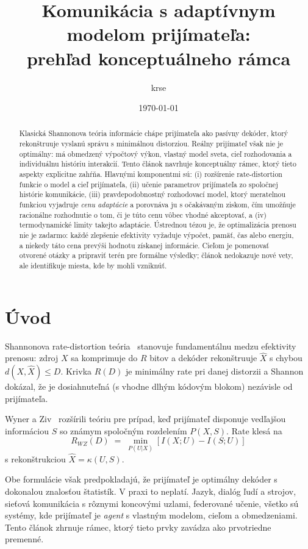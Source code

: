 \documentclass[11pt,a4paper]{article}
\title{Komunikácia s adaptívnym modelom prijímateľa:\\
prehľad konceptuálneho rámca}
\author{krse}
\date{\today}
\begin{document}
\maketitle

\begin{abstract}
\noindent
Klasická Shannonova teória informácie chápe prijímateľa ako pasívny
dekóder, ktorý rekonštruuje vyslanú správu s minimálnou distorziou.
Reálny prijímateľ však nie je optimálny: má obmedzený výpočtový výkon,
vlastný model sveta, cieľ rozhodovania a individuálnu históriu
interakcií. Tento článok navrhuje konceptuálny rámec, ktorý tieto
aspekty explicitne zahŕňa. Hlavnými komponentmi sú: (i) rozšírenie
rate-distortion funkcie o model a cieľ prijímateľa, (ii) učenie
parametrov prijímateľa zo spoločnej histórie komunikácie,
(iii) pravdepodobnostný rozhodovací model, ktorý meratelnou funkciou
vyjadruje \emph{cenu adaptácie} a porovnáva ju s očakávaným ziskom,
čím umožňuje racionálne rozhodnutie o tom, či je túto cenu vôbec
vhodné akceptovať, a (iv) termodynamické limity takejto adaptácie.
Ústrednou tézou je, že optimalizácia prenosu nie je zadarmo: každé
zlepšenie efektivity vyžaduje výpočet, pamäť, čas alebo energiu, a
niekedy táto cena prevýši hodnotu získanej informácie.  Cieľom je
pomenovať otvorené otázky a pripraviť terén pre formálne výsledky;
článok nedokazuje nové vety, ale identifikuje miesta, kde by mohli
vzniknúť.
\end{abstract}

\section{Úvod}

Shannonova rate-distortion teória~\cite{shannon1948,shannon1959}
stanovuje fundamentálnu medzu efektivity prenosu: zdroj $X$ sa
komprimuje do $R$ bitov a dekóder rekonštruuje $\hat{X}$ s chybou
$d(X,\hat{X}) \le D$. Krivka $R(D)$ je minimálny rate pri danej
distorzii a Shannon dokázal, že je dosiahnuteľná (s vhodne dlhým
kódovým blokom) nezávisle od prijímateľa.

Wyner a Ziv~\cite{wynerziv1976} rozšírili teóriu pre prípad, keď
prijímateľ disponuje vedľajšou informáciou $S$ so známym spoločným
rozdelením $P(X,S)$. Rate klesá na
\[
    R_{WZ}(D) \;=\; \min_{P(U|X)} [I(X;U) - I(S;U)]
\]
s rekonštrukciou $\hat{X} = \kappa(U,S)$.

Obe formulácie však predpokladajú, že prijímateľ je optimálny dekóder
s dokonalou znalosťou štatistík. V praxi to neplatí. Jazyk, dialóg
ľudí a strojov, sieťová komunikácia s rôznymi koncovými uzlami,
federované učenie, všetko sú systémy, kde prijímateľ je
\emph{agent} s vlastným modelom, cieľom a obmedzeniami. Tento článok
zhrnuje rámec, ktorý tieto prvky zavádza ako prvotriedne premenné.
\end{document}
